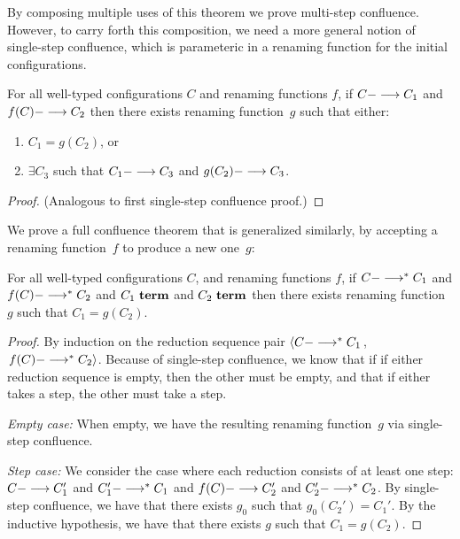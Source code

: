 By composing multiple uses of this theorem
we prove multi-step confluence.
However, to carry forth this composition, we need a more general
notion of single-step confluence, which is parameteric in a renaming
function for the initial configurations.

\begin{theorem}
For all well-typed configurations $C$ 
and renaming functions $f$,
%
 if $C ---> C_1$ 
and $f(C) ---> C_2$ 
then 
there exists renaming function~$g$ 
such that either:
\begin{enumerate}
\item %
$C_1 = g(C_2)$,
or
\item $\exists C_3$ such that $C_1 ---> C_3$ and $g(C_2) ---> C_3$.
\end{enumerate}
\begin{proof}
  (Analogous to first single-step confluence proof.)
\end{proof}
\end{theorem}

We prove a full confluence theorem that is generalized similarly, by
accepting a renaming function~$f$ to produce a new one~$g$:

\begin{theorem}
For all well-typed configurations $C$,
and renaming functions $f$,
%
 if $C --->^\ast C_1$ 
and $f(C) --->^\ast C_2$ 
and $C_1~\textbf{term}$
and $C_2~\textbf{term}$
then 
there exists renaming function~$g$ 
such that $C_1 = g(C_2)$.
\begin{proof}
  By induction on the reduction sequence pair
  $\left< C --->^\ast C_1\right.$, 
  $\left.f(C) --->^\ast C_2 \right>$.
  Because of single-step confluence, we know that if
  if either reduction sequence is empty, then the other must be empty,
  and that
  if either takes a step, the other must take a step.
  
  \emph{Empty case:}
  When empty, we have the resulting renaming function~$g$ via single-step confluence.

  \emph{Step case:}
  We consider the case where each reduction consists of at least one step:
  $C ---> C_1'$ and $C_1' --->^\ast C_1$ and
  $f(C) ---> C_2'$ and $C_2' --->^\ast C_2$.
  By single-step confluence, we have that there exists $g_0$ such that $g_0(C_2') = C_1'$.
  By the inductive hypothesis, we have that there exists $g$ such that $C_1 = g(C_2)$.  
\end{proof}
\end{theorem}
